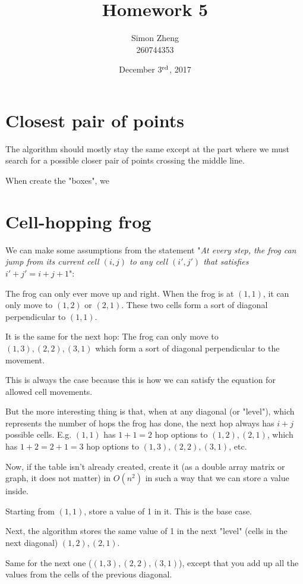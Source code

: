 \documentclass[11pt,letterpaper]{article}
\author{Simon Zheng\\260744353}
\title{Homework 5}
\date{December 3$^{\textnormal{rd}}$, 2017}
\begin{document}
	\maketitle
	\thispagestyle{fancy}
	
	\section{Closest pair of points}
		The algorithm should mostly stay the same except at the part where we must search for a possible closer pair of points crossing the middle line.
		
		When create the "boxes", we
	
	\section{Cell-hopping frog}
		We can make some assumptions from the statement "\textit{At every step, the frog can jump from its current cell $(i, j)$ to any cell $(i\prime , j\prime)$ that satisfies $i\prime + j\prime = i + j + 1$}":
		
		The frog can only ever move up and right.
		When the frog is at $(1,1)$, it can only move to $(1,2)$ or $(2,1)$. These two cells form a sort of diagonal perpendicular to $(1,1)$.
		
		It is the same for the next hop:
		The frog can only move to $(1,3), (2,2), (3,1)$ which form a sort of diagonal perpendicular to the movement.
		
		This is always the case because this is how we can satisfy the equation for allowed cell movements.
		
		But the more interesting thing is that, when at any diagonal (or "level"), which represents the number of hops the frog has done, the next hop always has $i + j$ possible cells. E.g. $(1,1)$ has $1+1=2$ hop options to $(1,2), (2,1)$, which has $1+2=2+1=3$ hop options to $(1,3), (2,2), (3,1)$, etc.
		
		Now, if the table isn't already created, create it (as a double array matrix or graph, it does not matter) in $O(n^2)$ in such a way that we can store a value inside.
		 
		Starting from $(1,1)$, store a value of 1 in it.
		This is the base case.
		
		Next, the algorithm stores the same value of 1 in the next "level" (cells in the next diagonal) $(1,2), (2,1)$.
		
		Same for the next one ($(1,3), (2,2), (3,1)$), except that you add up all the values from the cells of the previous diagonal.
		
\end{document}
